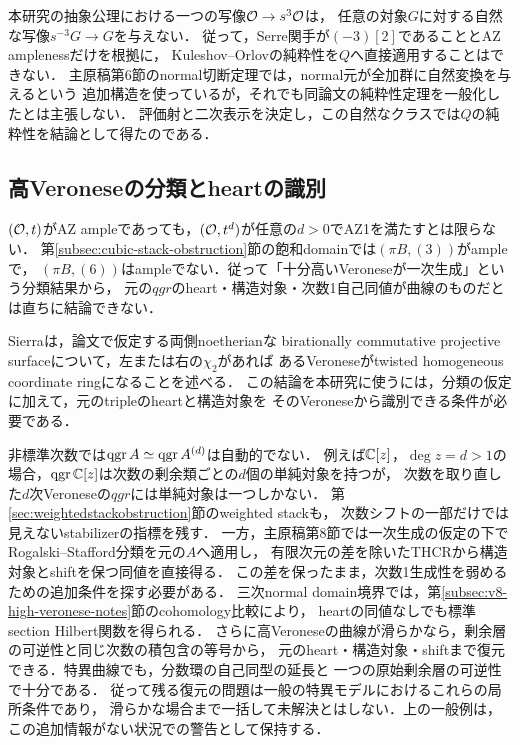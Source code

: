 \documentclass[11pt,a4paper]{ltjsarticle}
\begin{document}
本研究の抽象公理における一つの写像$\mathcal O\to s^3\mathcal O$は，
任意の対象$G$に対する自然な写像$s^{-3}G\to G$を与えない．
従って，Serre関手が$(-3)[2]$であることとAZ amplenessだけを根拠に，
Kuleshov--Orlovの純粋性を$Q$へ直接適用することはできない．
主原稿第6節のnormal切断定理では，normal元が全加群に自然変換を与えるという
追加構造を使っているが，それでも同論文の純粋性定理を一般化したとは主張しない．
評価射と二次表示を決定し，この自然なクラスでは$Q$の純粋性を結論として得たのである．


\subsection{高Veroneseの分類とheartの識別}
$(\mathcal O,t)$がAZ ampleであっても，$(\mathcal O,t^d)$が任意の$d>0$でAZ1を満たすとは限らない．
第\ref{subsec:cubic-stack-obstruction}節の飽和domainでは$(\pi B,(3))$がampleで，
$(\pi B,(6))$はampleでない．従って「十分高いVeroneseが一次生成」という分類結果から，
元の$qgr$のheart・構造対象・次数1自己同値が曲線のものだとは直ちに結論できない．

Sierra\cite[Theorem 1.11, Corollary 10.2]{SierraSurface}は，論文で仮定する両側noetherianな
birationally commutative projective surfaceについて，左または右の$\chi_2$があれば
あるVeroneseがtwisted homogeneous coordinate ringになることを述べる．
この結論を本研究に使うには，分類の仮定に加えて，元のtripleのheartと構造対象を
そのVeroneseから識別できる条件が必要である．

非標準次数では$\operatorname{qgr} A\simeq\operatorname{qgr} A^{(d)}$は自動的でない．
例えば$\mathbb C[z]$，$\deg z=d>1$の場合，$\operatorname{qgr}\mathbb C[z]$は次数の剰余類ごとの$d$個の単純対象を持つが，
次数を取り直した$d$次Veroneseの$qgr$には単純対象は一つしかない．
第\ref{sec:weightedstackobstruction}節のweighted stackも，
次数シフトの一部だけでは見えないstabilizerの指標を残す．
一方，主原稿第8節では一次生成の仮定の下でRogalski--Stafford分類を元の$A$へ適用し，
有限次元の差を除いたTHCRから構造対象とshiftを保つ同値を直接得る．
この差を保ったまま，次数1生成性を弱めるための追加条件を探す必要がある．
三次normal domain境界では，第\ref{subsec:v8-high-veronese-notes}節のcohomology比較により，
heartの同値なしでも標準section Hilbert関数を得られる．
さらに高Veroneseの曲線が滑らかなら，剰余層の可逆性と同じ次数の積包含の等号から，
元のheart・構造対象・shiftまで復元できる．特異曲線でも，分数環の自己同型の延長と
一つの原始剰余層の可逆性で十分である．
従って残る復元の問題は一般の特異モデルにおけるこれらの局所条件であり，
滑らかな場合まで一括して未解決とはしない．上の一般例は，この追加情報がない状況での警告として保持する．
\end{document}
